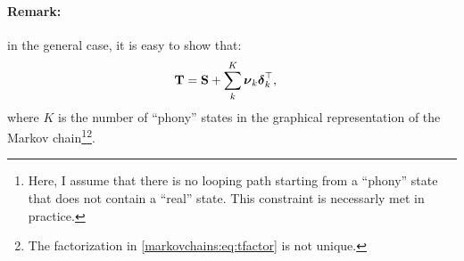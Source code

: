 \paragraph{Remark:} in the general case, it is easy to show that:
\begin{align}
    \boldsymbol{\mathbf{T}} &= \boldsymbol{\mathbf{S}} + \sum_{k}^K \boldsymbol{\mathbf{\nu}}_k \boldsymbol{\mathbf{\delta}}_k^\top,
    \label{markovchains:eq:tfactor}
\end{align}
where $K$ is the number of ``phony'' states in the graphical representation
of the Markov chain\footnote{
    Here, I assume that there is no looping path starting from a ``phony''
    state that does not contain a ``real'' state. This constraint
    is necessarly met in practice.
}\footnote{
    The factorization in \eqref{markovchains:eq:tfactor} is not unique.
}.



